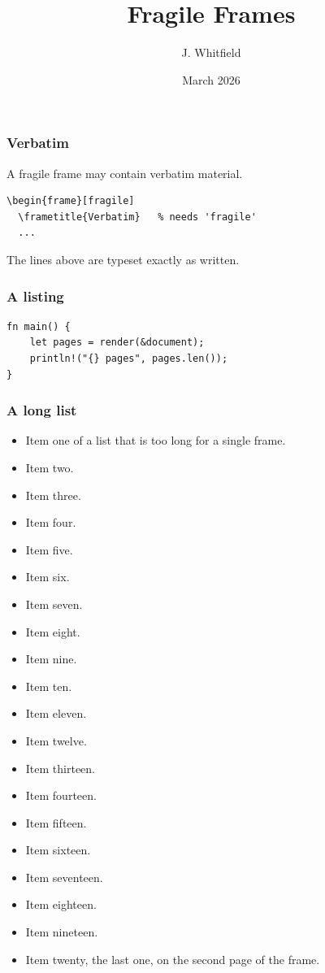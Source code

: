 \documentclass{beamer}
\title{Fragile Frames}
\author{J. Whitfield}
\date{March 2026}
\begin{document}
\begin{frame}
  \titlepage
\end{frame}

\begin{frame}[fragile]
  \frametitle{Verbatim}
  A fragile frame may contain verbatim material.
\begin{verbatim}
\begin{frame}[fragile]
  \frametitle{Verbatim}   % needs 'fragile'
  ...
\end{verbatim}
  The lines above are typeset exactly as written.
\end{frame}

\begin{frame}[fragile]
  \frametitle{A listing}
\begin{lstlisting}
fn main() {
    let pages = render(&document);
    println!("{} pages", pages.len());
}
\end{lstlisting}
\end{frame}

\begin{frame}[allowframebreaks]
  \frametitle{A long list}
  \begin{itemize}
    \item Item one of a list that is too long for a single frame.
    \item Item two.
    \item Item three.
    \item Item four.
    \item Item five.
    \item Item six.
    \item Item seven.
    \item Item eight.
    \item Item nine.
    \item Item ten.
    \item Item eleven.
    \item Item twelve.
    \item Item thirteen.
    \item Item fourteen.
    \item Item fifteen.
    \item Item sixteen.
    \item Item seventeen.
    \item Item eighteen.
    \item Item nineteen.
    \item Item twenty, the last one, on the second page of the frame.
  \end{itemize}
\end{frame}
\end{document}
